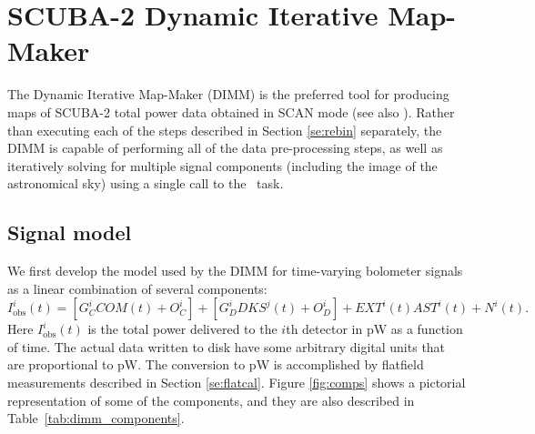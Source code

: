 \documentclass[oneside,11pt]{starlink}
\begin{document}
\section{SCUBA-2 Dynamic Iterative Map-Maker\label{se:dimm}}

The Dynamic Iterative Map-Maker (DIMM) is the preferred tool for
producing maps of SCUBA-2 total power data obtained in SCAN
mode\cite{sc2ana006} (see also \SMURFcook). Rather than executing each
of the steps described in Section \ref{se:rebin} separately, the DIMM
is capable of performing all of the data pre-processing steps, as well
as iteratively solving for multiple signal components (including the
image of the astronomical sky) using a single call to the \makemap\
task.

\subsection{Signal model}

We first develop the model used by the DIMM for time-varying bolometer
signals as a linear combination of several components:
%
\begin{equation}
I^i_{\mathrm{obs}}(t) = [G_C^i COM(t) + O_C^i] + [G_D^i DKS^j(t) + O_D^i] +
                      EXT^i(t) AST^i(t) + N^i(t).
\end{equation}
%
Here $I^i_{\mathrm{obs}}(t)$ is the total power delivered to the $i$th
detector in pW as a function of time. The actual data written to disk
have some arbitrary digital units that are proportional to pW. The
conversion to pW is accomplished by flatfield measurements described
in Section \ref{se:flatcal}. Figure \ref{fig:comps} shows a pictorial
representation of some of the components, and they are also described
in Table~\ref{tab:dimm_components}.
\end{document}

